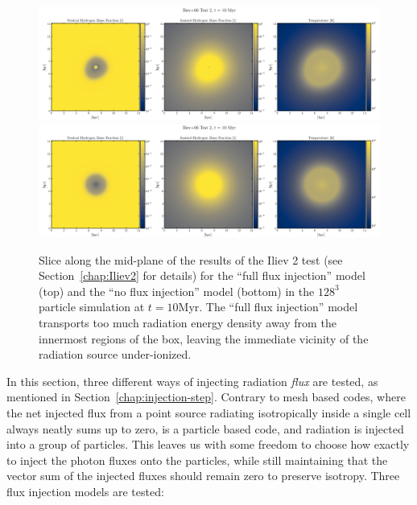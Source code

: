\begin{figure}
\centering
\includegraphics[width=\textwidth]
{figures/RHD/injection_models/injection_convergence_test_FullFlux128.png}\\
\includegraphics[width=\textwidth]
{figures/RHD/injection_models/injection_convergence_test_NoFlux128.png}
\caption{
Slice along the mid-plane of the results of the Iliev 2 test (see Section~\ref{chap:Iliev2} for
details) for the ``full flux injection'' model (top) and the ``no flux injection'' model (bottom)
in the $128^3$ particle simulation at $t = 10$Myr. The ``full flux injection'' model transports
too much radiation energy density away from the innermost regions of the box, leaving the immediate
vicinity of the radiation source under-ionized.
 }
 \label{fig:flux-injection-slices}
\end{figure}




In this section, three different ways of injecting radiation \emph{flux} are tested, as mentioned in
Section~\ref{chap:injection-step}. Contrary to mesh based codes, where the net injected flux from a
point source radiating isotropically inside a single cell always neatly sums up to zero, \GEARRT is
a particle based code, and radiation is injected into a group of particles. This leaves us with
some freedom to choose how exactly to inject the photon fluxes onto the particles, while still
maintaining that the vector sum of the injected fluxes should remain zero to preserve isotropy.
Three flux injection models are tested:


